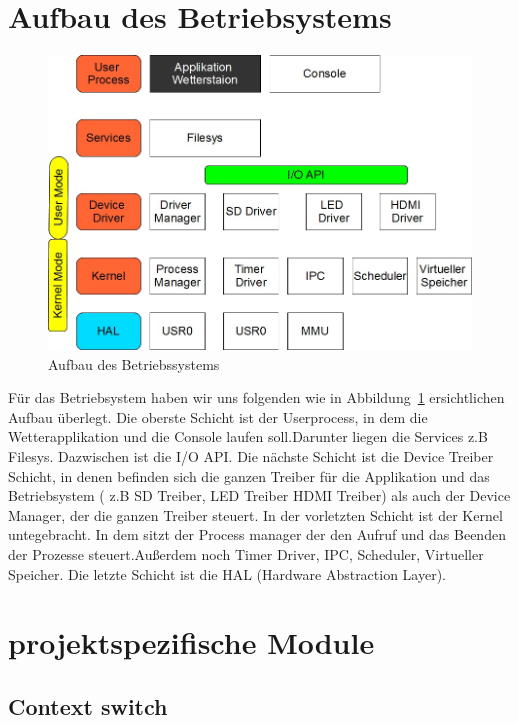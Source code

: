 \documentclass[10pt,a4paper,fleqn]{article}
\begin{document}
\section{Aufbau des Betriebsystems}

	\begin{figure}[h]
		\includegraphics[scale=0.5]{images/Aufbau.jpg}
		\caption{Aufbau des Betriebssystems}
		\label{fig01}
	\end{figure}
	
	Für das Betriebsystem haben wir uns folgenden wie in Abbildung~\ref{fig01} ersichtlichen
		Aufbau überlegt. Die oberste Schicht ist der
		Userprocess, in dem die Wetterapplikation und die Console laufen soll.Darunter liegen
		die Services z.B Filesys. Dazwischen ist die I/O API. Die nächste Schicht ist die
		Device Treiber Schicht, in denen befinden sich die ganzen Treiber für die Applikation und das
		Betriebsystem ( z.B SD Treiber, LED Treiber HDMI Treiber) als auch der Device Manager, der
		die ganzen Treiber steuert. In der vorletzten Schicht ist der Kernel untegebracht. In dem
		sitzt der Process manager der den Aufruf und das Beenden der Prozesse steuert.Außerdem noch
		Timer Driver, IPC, Scheduler, Virtueller Speicher. Die letzte Schicht ist die HAL (Hardware
		Abstraction Layer).

\section{projektspezifische Module}

\subsection{Context switch}
\end{document}
